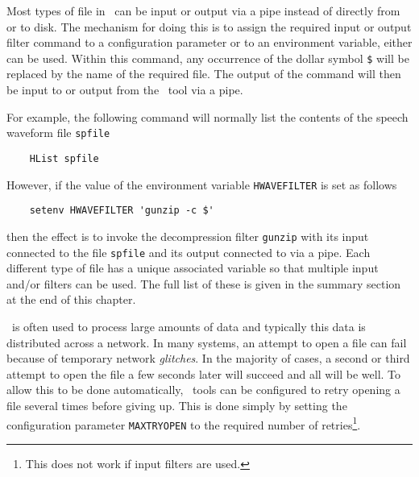 
Most types of file in \HTK\ can be input or output via a pipe
instead of directly from or to disk.  The mechanism for doing this is to assign
the required input or output filter command to a
configuration parameter or to an environment variable, either can be used.
Within this command, any occurrence of the dollar symbol
\verb+$+ will be replaced by the name of the required file. The
output of the command will then be input to or output from the \HTK\ tool via a
pipe.

For example, the following command will
normally list the contents of the speech waveform file \texttt{spfile}
\begin{verbatim}
    HList spfile
\end{verbatim}
However, if the value of the environment variable \texttt{HWAVEFILTER}
is set as follows
\begin{verbatim}
    setenv HWAVEFILTER 'gunzip -c $'
\end{verbatim}
then the effect is to invoke the decompression filter \texttt{gunzip} with its input connected to the file \texttt{spfile}
and its output connected to  via a pipe.  Each different type of
file has a unique associated variable so that multiple input and/or filters can
be used.  The full list of these is given in the summary section at the end of
this chapter.

\HTK\ is often used to process large amounts of data and typically this
data is distributed across a network.  In many systems, an attempt to open a
file can fail because of temporary network \textit{glitches}.  In the majority
of cases, a second or third attempt to open the file a few seconds later will
succeed and all will be well.  To allow this to be done automatically, 
\HTK\ tools can be configured to retry opening a file several times before giving up.
This is done simply by setting the configuration parameter
\texttt{MAXTRYOPEN} to the required
number of retries\footnote{ This does not work if input filters are used.  }.


